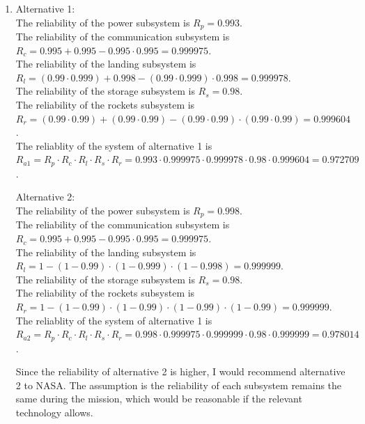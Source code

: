 \documentclass[10pt]{report}
\begin{document}
\begin{enumerate}
	\item 
	Alternative 1:\\
	The reliability of the power subsystem is $R_p = 0.993$.\\
	The reliability of the communication subsystem is $R_c = 0.995 + 0.995 - 0.995 \cdot 0.995 = 0.999975$.\\
	The reliability of the landing subsystem is $R_l = (0.99 \cdot 0.999) + 0.998 - (0.99 \cdot 0.999) \cdot 0.998 = 0.999978$.\\
	The reliability of the storage subsystem is $R_s = 0.98$.\\
	The reliability of the rockets subsystem is $R_r = (0.99 \cdot 0.99) + (0.99 \cdot 0.99) - (0.99 \cdot 0.99) \cdot (0.99 \cdot 0.99) = 0.999604$.\\
	The reliablity of the system of alternative 1 is $R_{a1} = R_p \cdot R_c \cdot R_l \cdot R_s \cdot R_r = 0.993 \cdot 0.999975 \cdot 0.999978 \cdot 0.98 \cdot 0.999604 = 0.972709$.
	
	Alternative 2:\\
	The reliability of the power subsystem is $R_p = 0.998$.\\
	The reliability of the communication subsystem is $R_c = 0.995 + 0.995 - 0.995 \cdot 0.995 = 0.999975$.\\
	The reliability of the landing subsystem is $R_l = 1 - (1 - 0.99) \cdot (1 - 0.999) \cdot (1 - 0.998) = 0.999999$.\\
	The reliability of the storage subsystem is $R_s = 0.98$.\\
	The reliability of the rockets subsystem is $R_r = 1 - (1 - 0.99) \cdot (1 - 0.99) \cdot (1 - 0.99) \cdot (1 - 0.99) = 0.999999$.\\
	The reliablity of the system of alternative 1 is $R_{a2} = R_p \cdot R_c \cdot R_l \cdot R_s \cdot R_r = 0.998 \cdot 0.999975 \cdot 0.999999 \cdot 0.98 \cdot 0.999999 = 0.978014$.
	
	Since the reliability of alternative 2 is higher, I would recommend alternative 2 to NASA. The assumption is the reliability of each subsystem remains the same during the mission, which would be reasonable if the relevant technology allows.
\end{enumerate}
\end{document}
